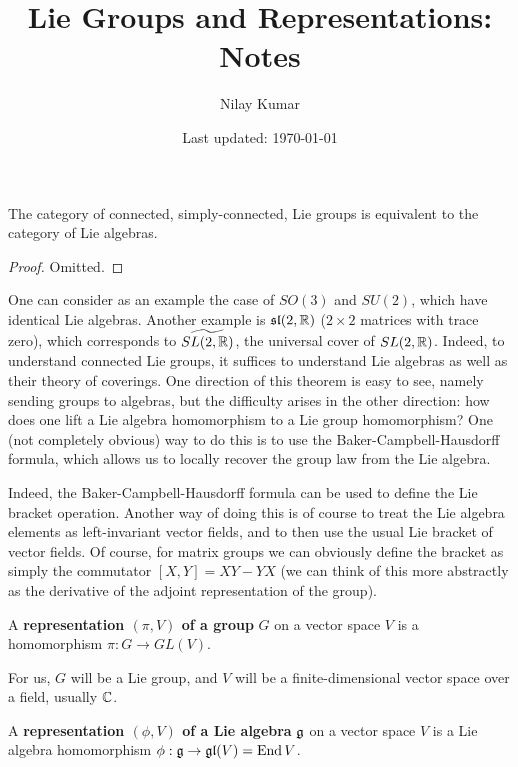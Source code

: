 \documentclass{../mathnotes}
\title{Lie Groups and Representations: Notes}
\author{Nilay Kumar}
\date{Last updated: \today}
\begin{document}
\maketitle


\begin{thm}
    The category of connected, simply-connected, Lie groups is equivalent to the category of Lie algebras.
\end{thm}
\begin{proof}
    Omitted.
\end{proof}

One can consider as an example the case of $SO(3)$ and $SU(2)$, which have identical Lie algebras. Another example is
$\mathfrak{sl}(2,\mathbb{R})$ ($2\times 2$ matrices with trace zero), which corresponds to $\widetilde{SL(2,\mathbb{R})}$, the universal cover of $SL(2,\mathbb{R})$.
Indeed, to understand connected Lie groups, it suffices to understand Lie algebras as well as their theory of coverings.
One direction of this theorem is easy to see, namely sending groups to algebras, but the difficulty arises in the other direction:
how does one lift a Lie algebra homomorphism to a Lie group homomorphism? One (not completely obvious) way to do this is to use the
Baker-Campbell-Hausdorff formula, which allows us to locally recover the group law from the Lie algebra.

Indeed, the Baker-Campbell-Hausdorff formula can be used to define the Lie bracket operation. Another way of doing this is of course to
treat the Lie algebra elements as left-invariant vector fields, and to then use the usual Lie bracket of vector fields.
Of course, for matrix groups we can obviously define the bracket as simply the commutator $[X,Y]=XY-YX$ (we can think of this more
abstractly as the derivative of the adjoint representation of the group).

\begin{defn}
    A \textbf{representation $(\pi, V)$ of a group} $G$ on a vector space $V$ is a homomorphism $\pi: G\to GL(V)$.
\end{defn}

\begin{rem}
    For us, $G$ will be a Lie group, and $V$ will be a finite-dimensional vector space over a field, usually $\mathbb{C}$.
\end{rem}

\begin{defn}
    A \textbf{representation $(\phi, V)$ of a Lie algebra} $\mathfrak g$ on a vector space $V$ is a Lie algebra homomorphism $\phi:\mathfrak g\to\mathfrak{gl}(V)=\operatorname{End} V$.    
\end{defn}
\end{document}
